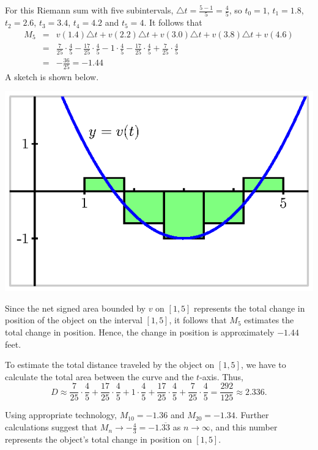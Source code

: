 \begin{activitySolution}
\ba
	\item For this Riemann sum with five subintervals, $\triangle t = \frac{5-1}{5} = \frac{4}{5}$, so $t_0 = 1$, $t_1 = 1.8$, $t_2 = 2.6$, $t_3 = 3.4$, $t_4 = 4.2$ and $t_5 = 4$.  It follows that
	\begin{eqnarray*}
		M_5 & = & v(1.4) \triangle t + v(2.2) \triangle t + v(3.0) \triangle t + v(3.8) \triangle t + v(4.6) \\
			& = & \frac{7}{25} \cdot \frac{4}{5} - \frac{17}{25} \cdot \frac{4}{5} - 1 \cdot \frac{4}{5} - \frac{17}{25} \cdot \frac{4}{5} +  \frac{7}{25} \cdot \frac{4}{5} \\
			& = & -\frac{36}{25} = -1.44
	\end{eqnarray*}	
	A sketch is shown below.
	\begin{center}
		\includegraphics{figures/4_2_Act3Soln.eps}
	\end{center}
	\item Since the net signed area bounded by $v$ on $[1,5]$ represents the total change in position of the object on the interval $[1,5]$, it follows that $M_5$ estimates the total change in position.  Hence, the change in position is approximately $-1.44$ feet.
	\item To estimate the total distance traveled by the object on $[1,5]$, we have to calculate the total area between the curve and the $t$-axis.  Thus,
	$$D \approx \frac{7}{25} \cdot \frac{4}{5} + \frac{17}{25} \cdot \frac{4}{5} + 1 \cdot \frac{4}{5} + \frac{17}{25} \cdot \frac{4}{5} +  \frac{7}{25} \cdot \frac{4}{5} = \frac{292}{125} \approx 2.336.$$
	\item Using appropriate technology, $M_{10} = -1.36$ and $M_{20} = -1.34$.  Further calculations suggest that $M_n \to -\frac{4}{3} = -1.\overline{33}$ as $n \to \infty$, and this number represents the object's total change in position on $[1,5]$.
\ea
\end{activitySolution}
\aftera





